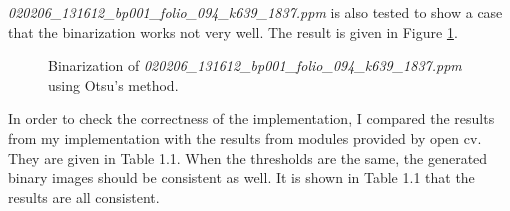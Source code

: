 \documentclass[paper=a4, fontsize=11pt]{scrartcl}
\numberwithin{equation}{section}		%
\numberwithin{figure}{section}			%
\numberwithin{table}{section}				%
\begin{document}
\emph{020206\_131612\_bp001\_folio\_094\_k639\_1837.ppm} is also tested to show a case that the binarization works not very well.
The result is given in Figure \ref{fig:binary:02}.

\begin{figure}[h]
\centering
{}
\caption{Binarization of \emph{020206\_131612\_bp001\_folio\_094\_k639\_1837.ppm}  using Otsu's method.}\label{fig:binary:02}
\end{figure}


In order to check the correctness of the implementation, I compared the results from my implementation with the results from modules provided by open cv.
They are given in Table 1.1. %
When the thresholds are the same, the generated binary images should be consistent as well.
It is shown in Table 1.1 that the results are all consistent.
\end{document}
